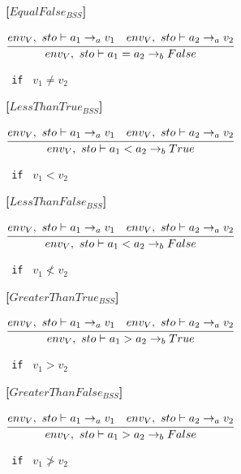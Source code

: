 \textbf{[$EqualFalse_{BSS}$]}\\
\begin{center}
	\begin{math}
	\cfrac
	{env_V,\ sto \vdash a_1 \rightarrow_a v_1 \quad env_V,\ sto \vdash a_2 \rightarrow_a v_2}
	{env_V,\ sto \vdash a_1 = a_2 \rightarrow_b False}
	\end{math}
	
	\texttt{ if } $v_1 \neq v_2$
\end{center}

\textbf{[$LessThanTrue_{BSS}$]}\\
\begin{center}
	\begin{math}
	\cfrac
	{env_V,\ sto \vdash a_1 \rightarrow_a v_1 \quad env_V,\ sto \vdash a_2 \rightarrow_a v_2}
	{env_V,\ sto \vdash a_1 < a_2 \rightarrow_b True}
	\end{math}
	
	\texttt{ if } $v_1 < v_2$
\end{center}

\textbf{[$LessThanFalse_{BSS}$]}\\
\begin{center}
	\begin{math}
	\cfrac
	{env_V,\ sto \vdash a_1 \rightarrow_a v_1 \quad env_V,\ sto \vdash a_2 \rightarrow_a v_2}
	{env_V,\ sto \vdash a_1 < a_2 \rightarrow_b False}
	\end{math}
	
	\texttt{ if } $v_1 \not< v_2$
\end{center}

\textbf{[$GreaterThanTrue_{BSS}$]}\\
\begin{center}
	\begin{math}
	\cfrac
	{env_V,\ sto \vdash a_1 \rightarrow_a v_1 \quad env_V,\ sto \vdash a_2 \rightarrow_a v_2}
	{env_V,\ sto \vdash a_1 > a_2 \rightarrow_b True}
	\end{math}
	
	\texttt{ if } $v_1 > v_2$
\end{center}

\textbf{[$GreaterThanFalse_{BSS}$]}\\
\begin{center}
	\begin{math}
	\cfrac
	{env_V,\ sto \vdash a_1 \rightarrow_a v_1 \quad env_V,\ sto \vdash a_2 \rightarrow_a v_2}
	{env_V,\ sto \vdash a_1 > a_2 \rightarrow_b False}
	\end{math}
	
	\texttt{ if } $v_1 \not> v_2$
\end{center}

